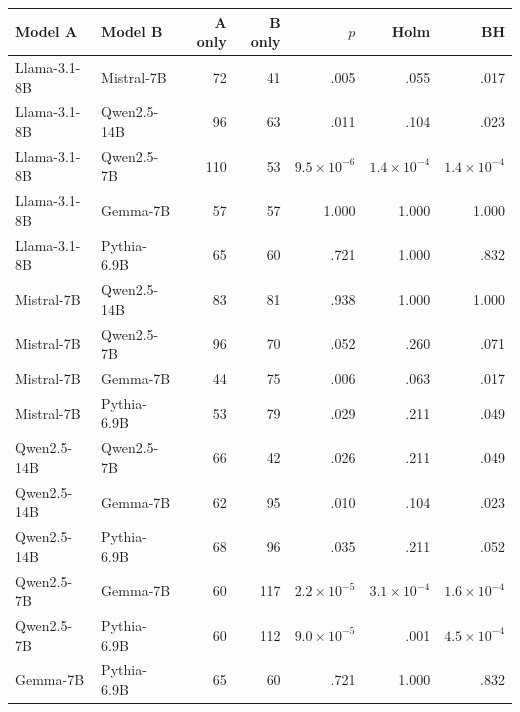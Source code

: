 \begin{tabular}{llrrrrr}
\toprule
Model A & Model B & A only & B only & $p$ & Holm & BH \\
\midrule
Llama-3.1-8B & Mistral-7B & 72 & 41 & .005 & .055 & .017 \\
Llama-3.1-8B & Qwen2.5-14B & 96 & 63 & .011 & .104 & .023 \\
Llama-3.1-8B & Qwen2.5-7B & 110 & 53 & $9.5{\times}10^{-6}$ & $1.4{\times}10^{-4}$ & $1.4{\times}10^{-4}$ \\
Llama-3.1-8B & Gemma-7B & 57 & 57 & 1.000 & 1.000 & 1.000 \\
Llama-3.1-8B & Pythia-6.9B & 65 & 60 & .721 & 1.000 & .832 \\
Mistral-7B & Qwen2.5-14B & 83 & 81 & .938 & 1.000 & 1.000 \\
Mistral-7B & Qwen2.5-7B & 96 & 70 & .052 & .260 & .071 \\
Mistral-7B & Gemma-7B & 44 & 75 & .006 & .063 & .017 \\
Mistral-7B & Pythia-6.9B & 53 & 79 & .029 & .211 & .049 \\
Qwen2.5-14B & Qwen2.5-7B & 66 & 42 & .026 & .211 & .049 \\
Qwen2.5-14B & Gemma-7B & 62 & 95 & .010 & .104 & .023 \\
Qwen2.5-14B & Pythia-6.9B & 68 & 96 & .035 & .211 & .052 \\
Qwen2.5-7B & Gemma-7B & 60 & 117 & $2.2{\times}10^{-5}$ & $3.1{\times}10^{-4}$ & $1.6{\times}10^{-4}$ \\
Qwen2.5-7B & Pythia-6.9B & 60 & 112 & $9.0{\times}10^{-5}$ & .001 & $4.5{\times}10^{-4}$ \\
Gemma-7B & Pythia-6.9B & 65 & 60 & .721 & 1.000 & .832 \\
\bottomrule
\end{tabular}
